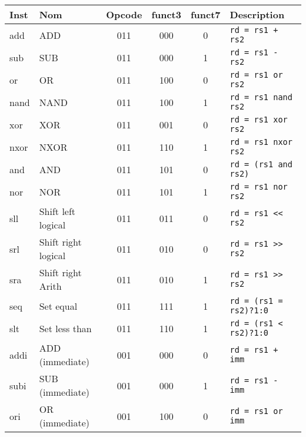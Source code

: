 \documentclass[a4paper]{article}
\begin{document}
    \begin{tabular}{|l|l|c|c|c|l|}
        \hline
        Inst  & Nom                             & Opcode & funct3 & funct7 & Description                   \\
        \hline

        add   & ADD                             & 011    & 000    & 0      & \texttt{rd = rs1 + rs2}       \\
        sub   & SUB                             & 011    & 000    & 1      & \texttt{rd = rs1 - rs2}       \\
        or    & OR                              & 011    & 100    & 0      & \texttt{rd = rs1 or rs2}      \\
        nand  & NAND                            & 011    & 100    & 1      & \texttt{rd = rs1 nand rs2}    \\
        xor   & XOR                             & 011    & 001    & 0      & \texttt{rd = rs1 xor rs2}     \\
        nxor  & NXOR                            & 011    & 110    & 1      & \texttt{rd = rs1 nxor rs2}    \\
        and   & AND                             & 011    & 101    & 0      & \texttt{rd = (rs1 and rs2)}   \\
        nor   & NOR                             & 011    & 101    & 1      & \texttt{rd = rs1 nor rs2}     \\
        sll   & Shift left logical              & 011    & 011    & 0      & \texttt{rd = rs1 << rs2}      \\
        srl   & Shift right logical             & 011    & 010    & 0      & \texttt{rd = rs1 >> rs2}      \\
        sra   & Shift right Arith               & 011    & 010    & 1      & \texttt{rd = rs1 >> rs2}      \\
        seq   & Set equal                       & 011    & 111    & 1      & \texttt{rd = (rs1 = rs2)?1:0} \\
        slt   & Set less than                   & 011    & 110    & 1      & \texttt{rd = (rs1 < rs2)?1:0} \\
        \hline
        addi  & ADD (immediate)                 & 001    & 000    & 0      & \texttt{rd = rs1 + imm}       \\
        subi  & SUB (immediate)                 & 001    & 000    & 1      & \texttt{rd = rs1 - imm}       \\
        ori   & OR (immediate)                  & 001    & 100    & 0      & \texttt{rd = rs1 or imm}      \\

\end{tabular}
\end{document}
